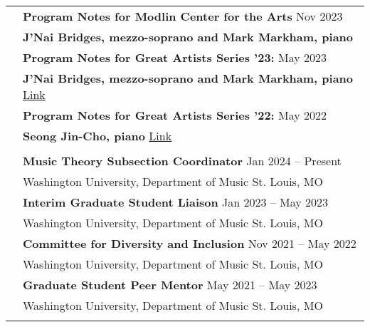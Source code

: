 \documentclass[letterpaper, 11pt]{article}
\begin{document}
\begin{longtable}{p{1.3in}p{4.8in}}
\nohyphens{\color{OliveGreen}{Public Scholarship}} 
& \textbf{Program Notes for Modlin Center for the Arts} \hfill{Nov 2023} \\
& \textbf{J'Nai Bridges, mezzo-soprano and Mark Markham, piano} \hfill \\
& \textbf{Program Notes for Great Artists Series '23:} \hfill{May 2023} \\
& \textbf{J'Nai Bridges, mezzo-soprano and Mark Markham, piano} \hfill \href{https://drive.google.com/file/d/1VVsDLn_SQQVU6xove93dTyiRJL8_1enJ/view?usp=sharing}{Link} \\
& \textbf{Program Notes for Great Artists Series '22:} \hfill{May 2022} \\
& \textbf{Seong Jin-Cho, piano} \hfill \href{https://music.wustl.edu/events/great-artists-series-cho?d=2022-05-01}{Link} \\
& \\

\color{OliveGreen}{University Service}
& \textbf{Music Theory Subsection Coordinator} \hfill Jan 2024 -- Present \\
& Washington University, Department of Music \hfill St. Louis, MO \\
& \textbf{Interim Graduate Student Liaison} \hfill Jan 2023 -- May 2023 \\
& Washington University, Department of Music \hfill St. Louis, MO \\
& \textbf{Committee for Diversity and Inclusion} \hfill Nov 2021 -- May 2022 \\
& Washington University, Department of Music \hfill St. Louis, MO \\
& \textbf{Graduate Student Peer Mentor} \hfill May 2021  -- May 2023 \\
& Washington University, Department of Music \hfill St. Louis, MO\\
& \\


\end{longtable}
\end{document}
